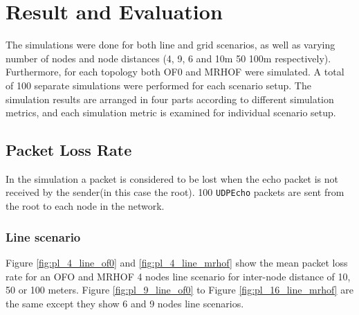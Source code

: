 \chapter{Result and Evaluation}
\label{ResultandEvaluation}

The simulations were done for both line and grid scenarios, as well as varying number of nodes and node distances (4, 9, 6 and 10m 50 100m respectively). Furthermore, for each topology both OF0 and MRHOF were simulated. A total of 100 separate simulations were performed for each scenario setup. The simulation results are arranged in four parts according to different simulation metrics, and each simulation metric is examined for individual scenario setup. 

\section{Packet Loss Rate}
\label{pl}

In the simulation a packet is considered to be lost when the echo packet is not received by the sender(in this case the root). 100 \texttt{UDPEcho} packets are sent from the root to each node in the network.

\subsection{Line scenario}
\label{pl:line}
Figure \ref{fig:pl_4_line_of0} and \ref{fig:pl_4_line_mrhof} show the mean packet loss rate for an OFO and MRHOF 4 nodes line scenario for inter-node distance of 10, 50 or 100 meters. Figure \ref{fig:pl_9_line_of0} to Figure \ref{fig:pl_16_line_mrhof} are the same except they show 6 and 9 nodes line scenarios.

